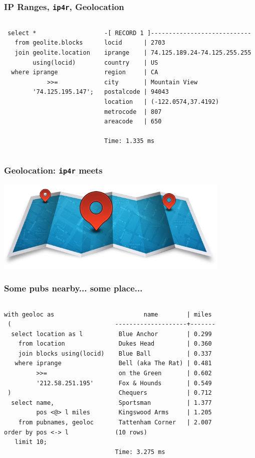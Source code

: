 \documentclass{beamer}
\begin{document}
\begin{frame}[fragile]
  \frametitle{IP Ranges, \texttt{ip4r}, Geolocation}

  \vfill

\begin{columns}
\begin{verbatim}
 select *
   from geolite.blocks
   join geolite.location
        using(locid)
  where iprange
            >>=
        '74.125.195.147';
\end{verbatim}
\begin{verbatim}
-[ RECORD 1 ]----------------------------
locid      | 2703
iprange    | 74.125.189.24-74.125.255.255
country    | US
region     | CA
city       | Mountain View
postalcode | 94043
location   | (-122.0574,37.4192)
metrocode  | 807
areacode   | 650

Time: 1.335 ms
\end{verbatim}
\end{columns}
\end{frame}

\begin{frame}[fragile]
  \frametitle{Geolocation: \texttt{ip4r} meets }

\begin{center}
  \includegraphics[height=12em]{geolocation.png}
\end{center}
\end{frame}

\begin{frame}[fragile]
  \frametitle{Some pubs nearby... some place...}

\begin{columns}
\begin{verbatim}
with geoloc as
 (
  select location as l
    from location
    join blocks using(locid)
   where iprange
         >>=
         '212.58.251.195'
 )
  select name,
         pos <@> l miles
    from pubnames, geoloc
order by pos <-> l
   limit 10;
\end{verbatim}  
\begin{verbatim}
        name        | miles 
--------------------+-------
 Blue Anchor        | 0.299
 Dukes Head         | 0.360
 Blue Ball          | 0.337
 Bell (aka The Rat) | 0.481
 on the Green       | 0.602
 Fox & Hounds       | 0.549
 Chequers           | 0.712
 Sportsman          | 1.377
 Kingswood Arms     | 1.205
 Tattenham Corner   | 2.007
(10 rows)

Time: 3.275 ms
\end{verbatim}  
\end{columns}
\end{frame}
\end{document}
